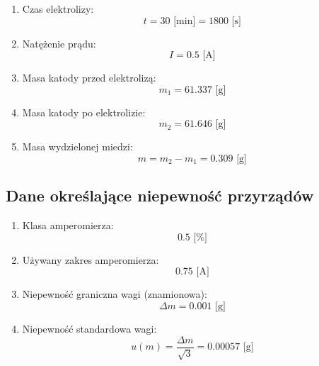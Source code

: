 \documentclass[a4paper,12pts]{article}
\begin{document}
\begin{enumerate}
	\item Czas elektrolizy:
	\begin{equation}
	t = 30 \textrm{ [min]} = 1800 \textrm{ [s]}
	\end{equation}
	
	\item Natężenie prądu:
	\begin{equation}
	I = 0.5 \textrm{ [A]}
	\end{equation}
	
	\item Masa katody przed elektrolizą:
	\begin{equation}
	m_{1} = 61.337 \textrm{ [g]}
	\end{equation}
	
	\item Masa katody po elektrolizie:
	\begin{equation}
	m_{2} = 61.646 \textrm{ [g]}
	\end{equation}
	
	\item Masa wydzielonej miedzi:
	\begin{equation}
	m = m_{2} - m_{1} = 0.309 \textrm{ [g]}
	\end{equation}
\end{enumerate}


\subsection{Dane określające niepewność przyrządów}

\begin{enumerate}
	\item Klasa amperomierza: 
	$$0.5 \textrm{ [\%]}$$
	\item Używany zakres amperomierza: 
	$$0.75 \textrm{ [A]}$$
	\item Niepewność graniczna wagi (znamionowa): 
	$$\Delta m = 0.001 \textrm{ [g]}$$
	\item Niepewność standardowa wagi: 
	$$u(m) = \frac{\Delta m}{\sqrt{3}} = 0.00057 \textrm{ [g]}$$
\end{enumerate}


\end{document}
